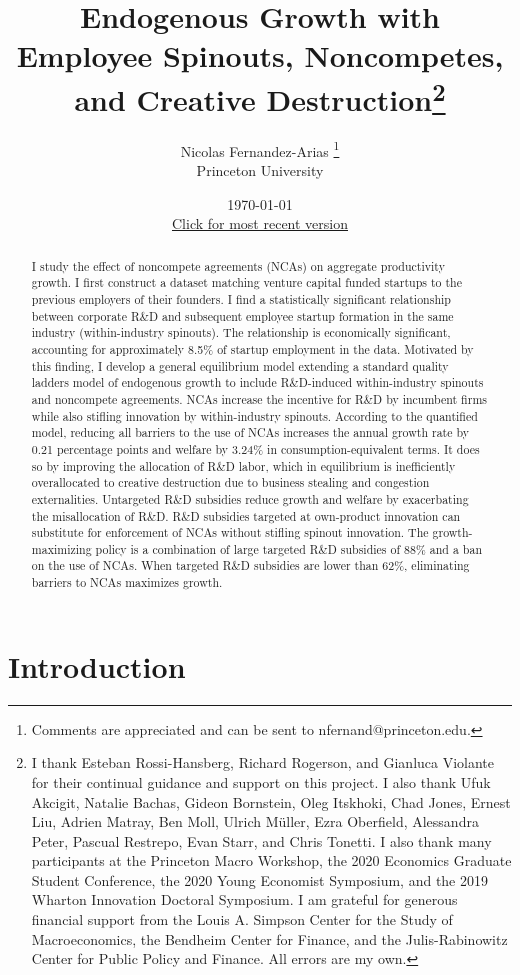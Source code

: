 \documentclass[11pt,english]{article}
\title{Endogenous Growth with Employee Spinouts, Noncompetes, and Creative Destruction\thanks{I thank Esteban Rossi-Hansberg, Richard Rogerson, and Gianluca Violante for their continual guidance and support on this project. I also thank Ufuk Akcigit, Natalie Bachas, Gideon Bornstein, Oleg Itskhoki, Chad Jones, Ernest Liu, Adrien Matray, Ben Moll, Ulrich M\"uller, Ezra Oberfield, Alessandra Peter, Pascual Restrepo, Evan Starr, and Chris Tonetti. I also thank many participants at the Princeton Macro Workshop, the 2020 Economics Graduate Student Conference, the 2020 Young Economist Symposium, and the 2019 Wharton Innovation Doctoral Symposium. I am grateful for generous financial support from the Louis A. Simpson Center for the Study of Macroeconomics, the Bendheim Center for Finance, and the Julis-Rabinowitz Center for Public Policy and Finance. All errors are my own.}}
\author{Nicolas Fernandez-Arias \thanks{Comments are appreciated and can be sent to nfernand@princeton.edu.}\\ Princeton University}
\date{\today \\ \small
	\href{https://www.nicolasfernandez-arias.me/files/Fernandez-Arias_JMP.pdf}{Click for most recent version}}
\theoremstyle{definition}
\begin{document}
\begin{titlepage}
	\maketitle
	
	
	\begin{abstract}
		I study the effect of noncompete agreements (NCAs) on aggregate productivity growth. I first construct a dataset matching venture capital funded startups to the previous employers of their founders. I find a statistically significant relationship between corporate R\&D and subsequent employee startup formation in the same industry (within-industry spinouts). The relationship is economically significant, accounting for approximately 8.5\% of startup employment in the data. Motivated by this finding, I develop a general equilibrium model extending a standard quality ladders model of endogenous growth to include R\&D-induced within-industry spinouts and noncompete agreements. NCAs increase the incentive for R\&D by incumbent firms while also stifling innovation by within-industry spinouts. According to the quantified model, reducing all barriers to the use of NCAs increases the annual growth rate by 0.21 percentage points and welfare by 3.24\% in consumption-equivalent terms. It does so by improving the allocation of R\&D labor, which in equilibrium is inefficiently overallocated to creative destruction due to business stealing and congestion externalities. Untargeted R\&D subsidies reduce growth and welfare by exacerbating the misallocation of R\&D. R\&D subsidies targeted at own-product innovation can substitute for enforcement of NCAs without stifling spinout innovation. The growth-maximizing policy is a combination of large targeted R\&D subsidies of 88\% and a ban on the use of NCAs. When targeted R\&D subsidies are lower than 62\%, eliminating barriers to NCAs maximizes growth.
	\end{abstract}
\end{titlepage}






\section{Introduction}
\end{document}
